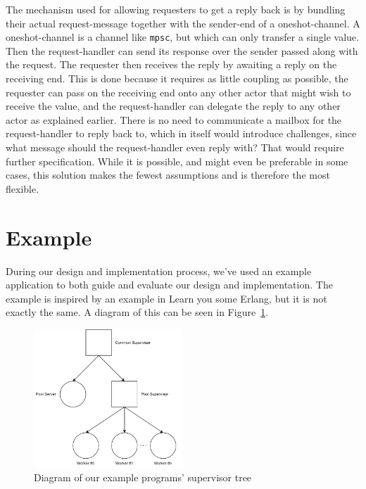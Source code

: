 \documentclass[a4paper]{article}
\newcommand\figref[1]{Figure~\ref{#1}}
\begin{document}
\begin{itemize}
  The mechanism used for allowing requesters to get a reply back is by bundling
  their actual request-message together with the sender-end of a
  oneshot-channel. A oneshot-channel is a channel like \texttt{mpsc}, but which
  can only transfer a single value. Then the request-handler can send its
  response over the sender passed along with the request. The requester then
  receives the reply by awaiting a reply on the receiving end. This is done because
  it requires as little coupling as possible, the requester can pass on the
  receiving end onto any other actor that might wish to receive the value, and
  the request-handler can delegate the reply to any other actor as explained
  earlier. There is no need to communicate a mailbox for the request-handler to
  reply back to, which in itself would introduce challenges, since what message
  should the request-handler even reply with? That would require further
  specification. While it is possible, and might even be preferable in some
  cases, this solution makes the fewest assumptions and is therefore the most
  flexible.

\end{itemize}
\section{Example}
During our design and implementation process, we've used an example application
to both guide and evaluate our design and implementation. The example is
inspired by an example in Learn you some Erlang\cite{LYSE}, but it is not
exactly the same. A diagram of this can be seen in \figref{fig:example_diagram}.

\begin{figure}[h!]
  \centering
  \includegraphics[width=0.5\textwidth]{./resources/PoolDiagram.pdf}
  \caption{Diagram of our example programs' supervisor tree}
  \label{fig:example_diagram}
\end{figure}
\end{document}
